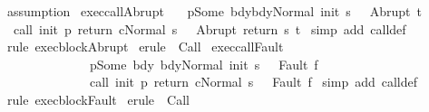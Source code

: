 \begin{isabellebody}
\isamarkupfalse%
\ assumption\isanewline
{}\isamarkupfalse%
%
\endisatagproof
{\isafoldproof}%
%
\isadelimproof
\isanewline
%
\endisadelimproof
\isanewline
\isanewline
{}\isamarkupfalse%
\ exec{\isacharunderscore}callAbrupt{\isacharcolon}\ \isanewline
\ {\isachardoublequoteopen}{\isasymlbrakk}{\isasymGamma}\ p{\isacharequal}Some\ bdy{\isacharsemicolon}{\isasymGamma}{\isasymturnstile}{\isasymlangle}bdy{\isacharcomma}Normal\ {\isacharparenleft}init\ s{\isacharparenright}{\isasymrangle}\ {\isasymRightarrow}\ \ Abrupt\ t{\isasymrbrakk}\ \isanewline
\ \ {\isasymLongrightarrow}\ \isanewline
\ \ {\isasymGamma}{\isasymturnstile}{\isasymlangle}call\ init\ p\ return\ c{\isacharcomma}Normal\ s{\isasymrangle}\ {\isasymRightarrow}\ \ Abrupt\ {\isacharparenleft}return\ s\ t{\isacharparenright}{\isachardoublequoteclose}\isanewline
%
\isadelimproof
%
\endisadelimproof
%
\isatagproof
{}\isamarkupfalse%
\ {\isacharparenleft}simp\ add{\isacharcolon}\ call{\isacharunderscore}def{\isacharparenright}\isanewline
{}\isamarkupfalse%
\ {\isacharparenleft}rule\ exec{\isacharunderscore}blockAbrupt{\isacharparenright}\isanewline
{}\isamarkupfalse%
\ {\isacharparenleft}erule\ {\isacharparenleft}{}{\isacharparenright}\ Call{\isacharparenright}\isanewline
{}\isamarkupfalse%
%
\endisatagproof
{\isafoldproof}%
%
\isadelimproof
\isanewline
%
\endisadelimproof
\isanewline
{}\isamarkupfalse%
\ exec{\isacharunderscore}callFault{\isacharcolon}\ \isanewline
\ \ \ \ \ \ \ \ \ \ \ \ \ {\isachardoublequoteopen}{\isasymlbrakk}{\isasymGamma}\ p{\isacharequal}Some\ bdy{\isacharsemicolon}\ {\isasymGamma}{\isasymturnstile}{\isasymlangle}bdy{\isacharcomma}Normal\ {\isacharparenleft}init\ s{\isacharparenright}{\isasymrangle}\ {\isasymRightarrow}\ \ Fault\ f{\isasymrbrakk}\ \isanewline
\ \ \ \ \ \ \ \ \ \ \ \ \ \ \ {\isasymLongrightarrow}\ \isanewline
\ \ \ \ \ \ \ \ \ \ \ \ \ \ {\isasymGamma}{\isasymturnstile}{\isasymlangle}call\ init\ p\ return\ c{\isacharcomma}Normal\ s{\isasymrangle}\ {\isasymRightarrow}\ \ Fault\ f{\isachardoublequoteclose}\isanewline
%
\isadelimproof
%
\endisadelimproof
%
\isatagproof
{}\isamarkupfalse%
\ {\isacharparenleft}simp\ add{\isacharcolon}\ call{\isacharunderscore}def{\isacharparenright}\isanewline
{}\isamarkupfalse%
\ {\isacharparenleft}rule\ exec{\isacharunderscore}blockFault{\isacharparenright}\isanewline
{}\isamarkupfalse%
\ {\isacharparenleft}erule\ {\isacharparenleft}{}{\isacharparenright}\ Call{\isacharparenright}\isanewline

\end{isabellebody}
